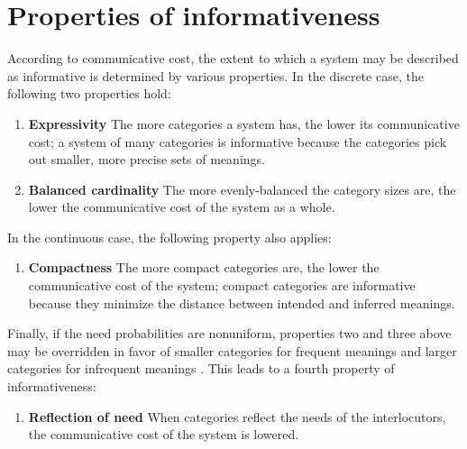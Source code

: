 \documentclass[a4paper, 11pt]{article}
\begin{document}
\section{Properties of informativeness}

According to communicative cost, the extent to which a system may be described as informative is determined by various properties. In the discrete case, the following two properties hold:

	\begin{enumerate}

		\item \textbf{Expressivity} The more categories a system has, the lower its communicative cost; a system of many categories is informative because the categories pick out smaller, more precise sets of meanings.

		\item \textbf{Balanced cardinality} The more evenly-balanced the category sizes are, the lower the communicative cost of the system as a whole.

		\setcounter{comm_cost_enumeration}{\value{enumi}}
	\end{enumerate}

\noindent
In the continuous case, the following property also applies:

	\begin{enumerate}
		\setcounter{enumi}{\value{comm_cost_enumeration}}
		\item \textbf{Compactness} The more compact categories are, the lower the communicative cost of the system; compact categories are informative because they minimize the distance between intended and inferred meanings.
		\setcounter{comm_cost_enumeration}{\value{enumi}}
	\end{enumerate}

\noindent
Finally, if the need probabilities are nonuniform, properties two and three above may be overridden in favor of smaller categories for frequent meanings and larger categories for infrequent meanings \citep[see e.g.,][]{Regier:2016,Gibson:2017}. This leads to a fourth property of informativeness:

	\begin{enumerate}
		\setcounter{enumi}{\value{comm_cost_enumeration}}
		\item \textbf{Reflection of need} When categories reflect the needs of the interlocutors, the communicative cost of the system is lowered.
	\end{enumerate}



\end{document}
